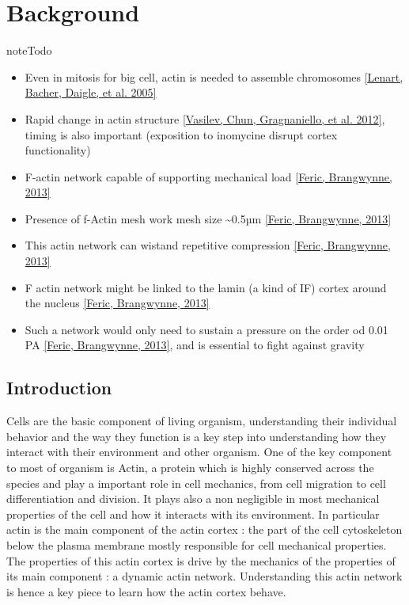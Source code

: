 \documentclass[A4paperpaper,11pt,english]{sphinxmanual}
\begin{document}
\chapter{Background}
\label{parts/part1::doc}\label{parts/part1:background}\label{parts/part1:contents}
\begin{notice}{note}{Todo}
\begin{itemize}
\item {} 
Even in mitosis for big cell, actin is needed to assemble chromosomes {\hyperref[bibitem:lenart2005]{{[}Lenart, Bacher, Daigle,  et al.  2005{]}}}

\item {} 
Rapid change in actin structure {\hyperref[bibitem:vasilev2012]{{[}Vasilev, Chun, Gragnaniello,  et al.  2012{]}}}, timing is also important (exposition to inomycine disrupt cortex functionality)

\item {} 
F-actin network capable of supporting mechanical load {\hyperref[bibitem:feric2013]{{[}Feric, Brangwynne,  2013{]}}}

\item {} 
Presence of f-Actin mesh work mesh size \textasciitilde{}0.5µm {\hyperref[bibitem:feric2013]{{[}Feric, Brangwynne,  2013{]}}}

\item {} 
This actin network can wistand repetitive compression {\hyperref[bibitem:feric2013]{{[}Feric, Brangwynne,  2013{]}}}

\item {} 
F actin network might be linked to the lamin (a kind of IF) cortex around the nucleus {\hyperref[bibitem:feric2013]{{[}Feric, Brangwynne,  2013{]}}}

\item {} 
Such a network would only need to sustain a pressure on the order od 0.01 PA {\hyperref[bibitem:feric2013]{{[}Feric, Brangwynne,  2013{]}}},
and is essential to fight against gravity

\end{itemize}
\end{notice}


\section{Introduction}
\label{parts/part1:introduction}
Cells are the basic component of living organism, understanding their
individual behavior and the way they function is a key step into understanding
how they interact with their environment and other organism. One of the key
component to most of organism is Actin, a protein which is highly conserved
across the species and play a important role in cell mechanics, from cell
migration to cell differentiation and division. It plays also a non negligible
in most mechanical properties of the cell and how it interacts with its
environment. In particular actin is the main component of the actin cortex :
the part of the cell cytoskeleton below the plasma membrane mostly responsible
for cell mechanical properties. The properties of this actin cortex is drive by
the mechanics of the properties of its main component : a dynamic actin
network. Understanding this actin network is hence a key piece to learn how
the actin cortex behave.
\end{document}
